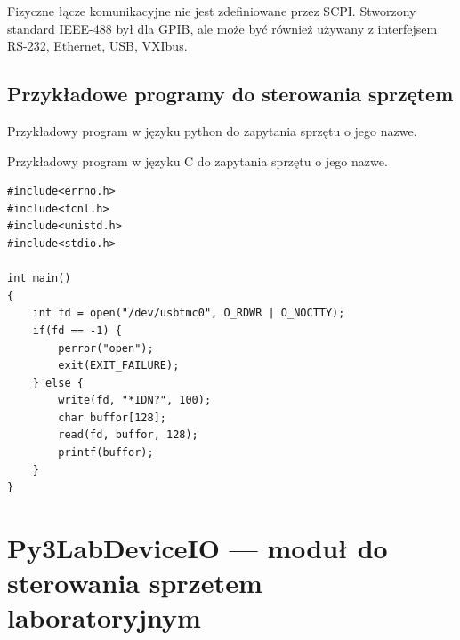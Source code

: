 \documentclass[a4paper, portrait,12pt]{report}
\begin{document}
Fizyczne łącze komunikacyjne nie jest zdefiniowane przez SCPI. Stworzony standard IEEE-488 był dla GPIB, ale może być również używany z interfejsem RS-232, Ethernet, USB, VXIbus.
\newpage
\section{Przykładowe programy do sterowania sprzętem}
Przykładowy program w języku python do zapytania sprzętu o jego nazwe.

Przykładowy program w języku C do zapytania sprzętu o jego nazwe.
\begin{lstlisting}
#include<errno.h>
#include<fcnl.h>
#include<unistd.h>
#include<stdio.h>

int main()
{
    int fd = open("/dev/usbtmc0", O_RDWR | O_NOCTTY);
    if(fd == -1) {
        perror("open");
        exit(EXIT_FAILURE);
    } else {
        write(fd, "*IDN?", 100);
        char buffor[128];
        read(fd, buffor, 128);
        printf(buffor);
    }
}

\end{lstlisting}

\newpage

\chapter{Py3LabDeviceIO --- moduł do sterowania sprzetem laboratoryjnym}
\end{document}
